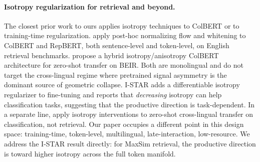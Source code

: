 \paragraph{Isotropy regularization for retrieval and beyond.} The closest prior work to ours applies isotropy techniques to ColBERT or to training-time regularization. \citet{jung2023isotropic} apply post-hoc normalizing flow and whitening to ColBERT and RepBERT, both sentence-level and token-level, on English retrieval benchmarks. \citet{kim2024hil} propose a hybrid isotropy/anisotropy ColBERT architecture for zero-shot transfer on BEIR. Both are monolingual and do not target the cross-lingual regime where pretrained signal asymmetry is the dominant source of geometric collapse. I-STAR \citep{rudman2024istar} adds a differentiable isotropy regularizer to fine-tuning and reports that \emph{decreasing} isotropy can help classification tasks, suggesting that the productive direction is task-dependent. In a separate line, \citet{ji2023isotropic} apply isotropy interventions to zero-shot cross-lingual transfer on classification, not retrieval. Our paper occupies a different point in this design space: training-time, token-level, multilingual, late-interaction, low-resource. We address the I-STAR result directly: for MaxSim retrieval, the productive direction is toward higher isotropy across the full token manifold.
